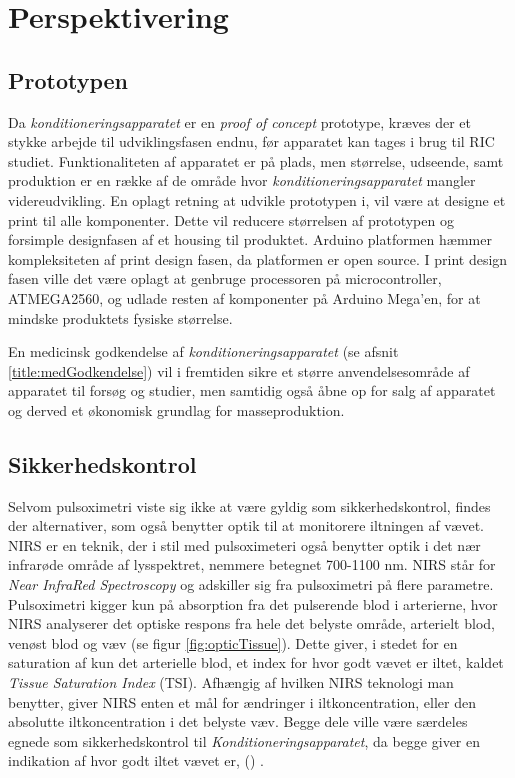 \chapter{Perspektivering} 

\section{Prototypen}
Da \textit{konditioneringsapparatet} er en \textit{proof of concept} prototype, kræves der et stykke arbejde til udviklingsfasen endnu, før apparatet kan tages i brug til RIC studiet. Funktionaliteten af apparatet er på plads, men størrelse, udseende, samt produktion er en række af de område hvor \textit{konditioneringsapparatet} mangler videreudvikling. En oplagt retning at udvikle prototypen i, vil være at designe et print til alle komponenter. Dette vil reducere størrelsen af prototypen og forsimple designfasen af et housing til produktet. Arduino platformen hæmmer kompleksiteten af print design fasen, da platformen er open source. I print design fasen ville det være oplagt at genbruge processoren på microcontroller, ATMEGA2560, og udlade resten af komponenter på Arduino Mega'en, for at mindske produktets fysiske størrelse. 

En medicinsk godkendelse af \textit{konditioneringsapparatet} (se afsnit \ref{title:medGodkendelse}) vil i fremtiden sikre et større anvendelsesområde af apparatet til forsøg og studier, men samtidig også åbne op for salg af apparatet og derved et økonomisk grundlag for masseproduktion.

\section{Sikkerhedskontrol}\label{title:nirs}
Selvom pulsoximetri viste sig ikke at være gyldig som sikkerhedskontrol, findes der alternativer, som også benytter optik til at monitorere iltningen af vævet. NIRS er en teknik, der i stil med pulsoximeteri også benytter optik i det nær infrarøde område af lysspektret, nemmere betegnet 700-1100 nm. NIRS står for \textit{Near InfraRed Spectroscopy} og adskiller sig fra pulsoximetri på flere parametre. Pulsoximetri kigger kun på absorption fra det pulserende blod i arterierne, hvor NIRS analyserer det optiske respons fra hele det belyste område, arterielt blod, venøst blod og væv (se figur \ref{fig:opticTissue}). Dette giver, i stedet for en saturation af kun det arterielle blod, et index for hvor godt vævet er iltet, kaldet \textit{Tissue Saturation Index} (TSI). Afhængig af hvilken NIRS teknologi man benytter, giver NIRS enten et mål for ændringer i iltkoncentration, eller den absolutte iltkoncentration i det belyste væv. Begge dele ville være særdeles egnede som sikkerhedskontrol til \textit{Konditioneringsapparatet}, da begge giver en indikation af hvor godt iltet vævet er, (\cite{RefWorks:22}) .

